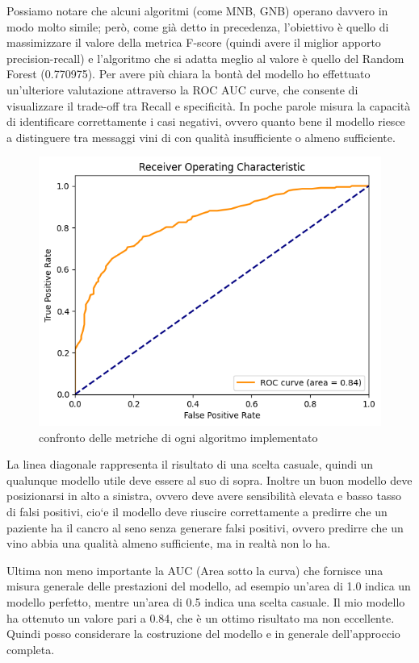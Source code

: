 \documentclass{article}
\begin{document}
\begin{titlepage}
        Possiamo notare che alcuni algoritmi (come MNB, GNB) operano davvero in modo molto simile; però, come già detto in precedenza, l'obiettivo è quello di massimizzare il valore della metrica F-score (quindi avere il miglior apporto precision-recall) e l'algoritmo che si adatta meglio al valore è quello del Random Forest (0.770975).
        Per avere più chiara la bontà del modello ho effettuato un’ulteriore valutazione attraverso la ROC
        AUC curve, che consente di visualizzare il trade-off tra Recall e specificità. In poche parole misura la
        capacità di identificare correttamente i casi negativi, ovvero quanto bene il modello riesce a distinguere
        tra messaggi vini di con qualità insufficiente o almeno sufficiente.
        \begin{figure}[ht]
            \centering
            \includegraphics[width=0.6\linewidth]{roc-auc-curve.png}
            \caption{  confronto delle metriche di ogni algoritmo implementato}
            \label{fig:enter-label}
        \end{figure}

        La linea diagonale rappresenta il risultato di una scelta casuale, quindi un
        qualunque modello utile deve essere al suo di sopra. Inoltre un buon modello
        deve posizionarsi in alto a sinistra, ovvero deve avere sensibilità elevata e basso
        tasso di falsi positivi, cio‘e il modello deve riuscire correttamente a predirre che
        un paziente ha il cancro al seno senza generare falsi positivi, ovvero predirre
        che un vino abbia una qualità almeno sufficiente, ma in realtà non lo ha.
        
        Ultima non meno
        importante la AUC (Area sotto la curva) che fornisce una misura generale delle
        prestazioni del modello, ad esempio un’area di 1.0 indica un modello perfetto,
        mentre un’area di 0.5 indica una scelta casuale. Il mio modello ha ottenuto
        un valore pari a 0.84, che è un ottimo risultato ma non eccellente. Quindi posso considerare la
        costruzione del modello e in generale dell’approccio completa.


\end{titlepage}
\end{document}
